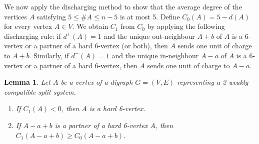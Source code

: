 \documentclass[11pt]{article}
\newtheorem{lemma}{Lemma}
\begin{document}
	We now apply the discharging method to show that the average degree of the vertices $A$ satisfying $5\le\#A\le n-5$ is at most 5. Define $C_0(A)=5-d(A)$ for every vertex $A\in V$. We obtain $C_1$ from $C_0$ by applying the following discharging rule: if $d^+(A)=1$ and the unique out-neighbour $A+b$ of $A$ is a 6-vertex or a partner of a hard 6-vertex (or both), then $A$ sends one unit of charge to $A+b$. Similarly, if $d^-(A)=1$ and the unique in-neighbour $A-a$ of $A$ is a 6-vertex or a partner of a hard 6-vertex, then $A$ sends one unit of charge to $A-a$.
	
	\begin{lemma}\label{lem:first-charge}
		Let $A$ be a vertex of a digraph $G=(V,E)$ representing a 2-weakly compatible split system.
		\begin{enumerate}[label=(\roman*)]
			\item If $C_1(A)<0$, then $A$ is a hard 6-vertex.
			\item If $A-a+b$ is a partner of a hard 6-vertex $A$, then $C_1(A-a+b)\ge C_0(A-a+b)$.
		\end{enumerate}
	\end{lemma}
	
\end{document}
